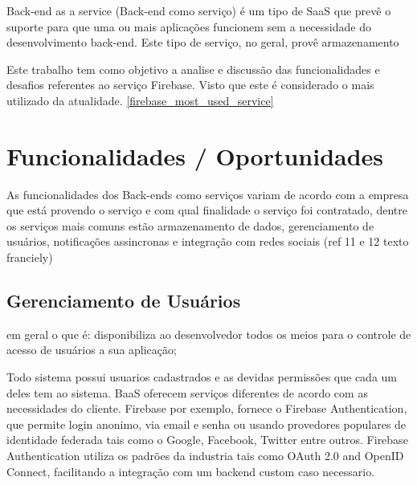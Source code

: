 	Back-end as a service (Back-end como serviço) é um tipo de SaaS que prevê o suporte para que uma ou mais aplicações funcionem sem a necessidade do desenvolvimento back-end. Este tipo de serviço, no geral, provê armazenamento 


	Este trabalho tem como objetivo a analise e discussão das funcionalidades e desafios referentes ao serviço Firebase. Visto que este é considerado o mais utilizado da atualidade. \ref{firebase_most_used_service}


\section{Funcionalidades / Oportunidades}
\label{sec:functionality}
	As funcionalidades dos Back-ends como serviços variam de acordo com a empresa que está provendo o serviço e com qual finalidade o serviço foi contratado, dentre os serviços mais comuns estão armazenamento de dados, gerenciamento de usuários, notificações assincronas e integração com redes sociais (ref 11 e 12 texto franciely)


	\subsection{Gerenciamento de Usuários} %
	\label{subsec:user_management}
	em geral o que é: disponibiliza ao desenvolvedor todos os meios para o controle de acesso de usuários a sua aplicação;
	
	Todo sistema possui usuarios cadastrados e as devidas permissões que cada um deles tem ao sistema. BaaS oferecem serviços diferentes de acordo com as necessidades do cliente. Firebase por exemplo, fornece o Firebase Authentication, que permite login anonimo, via email e senha ou usando provedores populares de identidade federada tais como o Google, Facebook, Twitter entre outros. Firebase Authentication utiliza os padrões da industria tais como OAuth 2.0 and OpenID Connect, facilitando a integração com um backend custom caso necessario.


